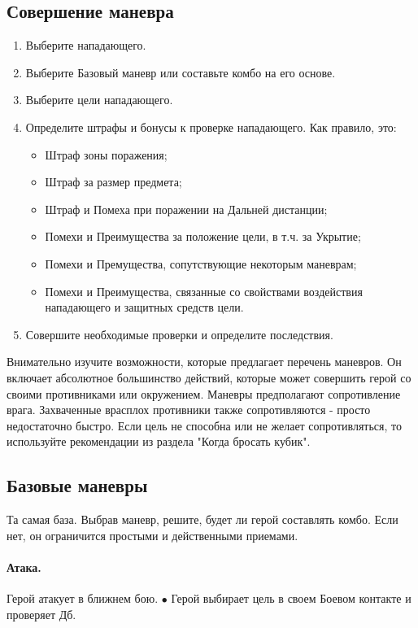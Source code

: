 \subsection{Совершение маневра}
\begin{enumerate}
  \item Выберите нападающего.
  \item Выберите Базовый маневр или составьте комбо на его основе.
  \item Выберите цели нападающего.
  \item Определите штрафы и бонусы к проверке нападающего. Как правило, это:
    \begin{itemize}
      \item Штраф зоны поражения;
      \item Штраф за размер предмета;
      \item Штраф и Помеха при поражении на Дальней дистанции;
      \item Помехи и Преимущества за положение цели, в т.ч. за Укрытие;
      \item Помехи и Премущества, сопутствующие некоторым маневрам;
      \item Помехи и Преимущества, связанные со свойствами воздействия нападающего и защитных средств цели.
    \end{itemize}
  \item Совершите необходимые проверки и определите последствия. 
\end{enumerate}
\begin{tcolorbox}
  Внимательно изучите возможности, которые предлагает перечень маневров. Он включает абсолютное большинство действий, которые может совершить герой со своими противниками или окружением.
  \newline Маневры предполагают сопротивление врага. Захваченные врасплох противники также сопротивляются - просто недостаточно быстро. Если цель не способна или не желает сопротивляться, то используйте рекомендации из раздела "Когда бросать кубик".
\end{tcolorbox}

\subsection{Базовые маневры}
Та самая база. Выбрав маневр, решите, будет ли герой составлять комбо. Если нет, он ограничится простыми и действенными приемами. 
\paragraph{Атака.} Герой атакует в ближнем бою.
$\bullet$ Герой выбирает цель в своем Боевом контакте и проверяет Дб.

